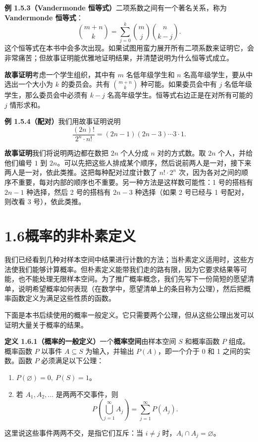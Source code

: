 \documentclass[UTF8, 12pt, fontset=fandol, oneside]{ctexart}
\begin{document}
\noindent\textbf{例 1.5.3（Vandermonde 恒等式）}\quad 二项系数之间有一个著名关系，称为\textbf{Vandermonde 恒等式}：
\[
  \binom{m+n}{k}
  =\sum_{j=0}^{k}\binom{m}{j}\binom{n}{k-j}.
\]
这个恒等式在本书中会多次出现。如果试图用蛮力展开所有二项系数来证明它，会非常痛苦；但故事证明能优雅地证明结果，并清楚说明为什么恒等式成立。

\noindent\textbf{故事证明}\quad 考虑一个学生组织，其中有 $m$ 名低年级学生和 $n$ 名高年级学生，要从中选出一个大小为 $k$ 的委员会。共有 $\binom{m+n}{k}$ 种可能。如果委员会中有 $j$ 名低年级学生，那么委员会中必须有 $k-j$ 名高年级学生。恒等式右边正是在对所有可能的 $j$ 情形求和。

\noindent\textbf{例 1.5.4（配对）}\quad 我们用故事证明说明
\[
  \frac{(2n)!}{2^n\cdot n!}=(2n-1)(2n-3)\cdots 3\cdot 1.
\]

\noindent\textbf{故事证明}\quad 我们将说明两边都在数把 $2n$ 个人分成 $n$ 对的方式数。取 $2n$ 个人，并给他们编号 $1$ 到 $2n$。可以先把这些人排成某个顺序，然后说前两人是一对，接下来两人是一对，依此类推。这把每种配对过度计数了 $n!\cdot 2^n$ 次，因为各对之间的顺序不重要，每对内部的顺序也不重要。另一种方法是这样数可能性：1 号的搭档有 $2n-1$ 种选择，然后 2 号的搭档有 $2n-3$ 种选择（如果 2 号已经与 1 号配对，则改看 3 号），依此类推。

\section*{1.6\quad 概率的非朴素定义}

我们已经看到几种对样本空间中结果进行计数的方法；当朴素定义适用时，这些方法使我们能够计算概率。但朴素定义能带我们走的路有限，因为它要求结果等可能，也不能处理无限样本空间。为了推广概率概念，我们先写下一份简短的愿望清单，说明希望概率如何表现（在数学中，愿望清单上的条目称为公理），然后把概率函数定义为满足这些性质的函数。

下面是本书后续使用的概率一般定义。它只需要两个公理，但从这些公理出发可以证明大量关于概率的结果。

\noindent\textbf{定义 1.6.1（概率的一般定义）}\quad 一个\textbf{概率空间}由样本空间 $S$ 和概率函数 $P$ 组成。概率函数 $P$ 以事件 $A\subseteq S$ 为输入，并输出 $P(A)$，即一个介于 0 和 1 之间的实数。函数 $P$ 必须满足以下公理：
\begin{enumerate}
  \item $P(\varnothing)=0,\ P(S)=1$。
  \item 若 $A_1,A_2,\ldots$ 是两两不交事件，则
  \[
    P\left(\bigcup_{j=1}^{\infty}A_j\right)
    =\sum_{j=1}^{\infty}P(A_j).
  \]
\end{enumerate}
这里说这些事件两两不交，是指它们互斥：当 $i\ne j$ 时，$A_i\cap A_j=\varnothing$。
\end{document}

